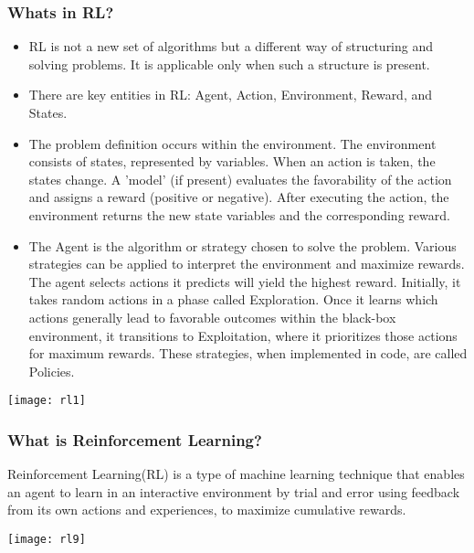 \begin{frame}[fragile]\frametitle{Whats in RL?}

\begin{itemize}
\item   RL is not a new set of algorithms but a different way of structuring and solving problems. It is applicable only when such a structure is present.
\item   There are key entities in RL: Agent, Action, Environment, Reward, and States.
\item   The problem definition occurs within the environment. The environment consists of states, represented by variables. When an action is taken, the states change. A 'model' (if present) evaluates the favorability of the action and assigns a reward (positive or negative). After executing the action, the environment returns the new state variables and the corresponding reward.
\item   The Agent is the algorithm or strategy chosen to solve the problem. Various strategies can be applied to interpret the environment and maximize rewards. The agent selects actions it predicts will yield the highest reward. Initially, it takes random actions in a phase called Exploration. Once it learns which actions generally lead to favorable outcomes within the black-box environment, it transitions to Exploitation, where it prioritizes those actions for maximum rewards. These strategies, when implemented in code, are called Policies.
\end{itemize}

\begin{center}
\texttt{[image: rl1]}
\end{center}
\end{frame}

\begin{frame}[fragile]\frametitle{What is Reinforcement Learning?}
Reinforcement Learning(RL) is a type of machine learning technique that enables an agent to learn in an interactive environment by trial and error using feedback from its own actions and experiences, to maximize cumulative rewards.

\begin{center}
\texttt{[image: rl9]}
\end{center}


\end{frame}


